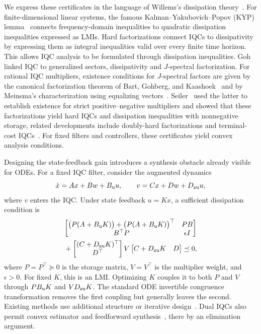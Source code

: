 We express these certificates in the
language of Willems's dissipation theory~\cite{willems1972dissipative1}.
For finite-dimensional linear systems, the famous Kalman--Yakubovich--Popov
(KYP) lemma~\cite{rantzer1996kyp} connects frequency-domain inequalities
to quadratic dissipation inequalities expressed as LMIs.
Hard factorizations connect IQCs to dissipativity by expressing them as
integral inequalities valid over every finite time horizon. This allows
IQC analysis to be formulated through dissipation inequalities.
Goh~\cite{577607} linked IQC to generalized sectors,
dissipativity and $J$-spectral factorization.
For rational IQC multipliers, existence conditions for $J$-spectral
factors are given by the canonical factorization theorem of
Bart, Gohberg, and Kaashoek~\cite{Bart1979MinimalFactorization} and by
Meinsma's characterization using equalizing vectors~\cite{MEINSMA1995243}.
Seiler~\cite{6915700} used the latter to establish existence for strict
positive--negative multipliers and showed that these factorizations yield
hard IQCs and dissipation inequalities with nonnegative storage,
related developments include doubly-hard
factorizations and terminal-cost
IQCs~\cite{carrasco2018equivalence,scherer2018dynamicdissipation}.
For fixed filters and controllers, these certificates yield convex
analysis conditions.

Designing the state-feedback gain introduces a synthesis obstacle already
visible for ODEs. For a fixed IQC filter, consider the augmented dynamics
\[
    \dot x=Ax+Bw+B_{\mathrm{u}}u,\qquad
    v=Cx+Dw+D_{\mathrm{zu}}u,
\]
where $v$ enters the IQC. Under state feedback $u=Kx$, a sufficient
dissipation condition is
\[
\begin{gathered}
    \begin{bmatrix}
        \bigl(P(A+B_{\mathrm{u}}K)\bigr) +  \bigl(P(A+B_{\mathrm{u}}K)\bigr)^\top& PB\\
        B^\top P & \epsilon I
    \end{bmatrix}\\
    {}+
    \begin{bmatrix}
        (C+D_{\mathrm{zu}}K)^\top\\ D^\top
    \end{bmatrix}
    V
    \begin{bmatrix}
        C+D_{\mathrm{zu}}K & D
    \end{bmatrix}
    \preceq0,
\end{gathered}
\]
where $P=P^\top\succeq0$ is the storage matrix, $V=V^\top$ is the
multiplier weight, and $\epsilon>0$.
For fixed $K$, this is an LMI. Optimizing $K$ couples it to both $P$ and
$V$ through $PB_{\mathrm{u}}K$ and $VD_{\mathrm{zu}}K$.
The standard ODE invertible congruence transformation removes the first coupling but
generally leaves the second. Existing methods use additional structure
or iterative design~\cite{7353149}. Dual IQCs also permit convex
estimator and feedforward synthesis~\cite{kose2009robust,venkataraman},
there by an elimination argument.

